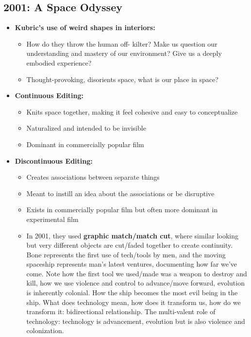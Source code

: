 \documentclass[11pt,fleqn]{book} %
\begin{document}
\subsection{2001: A Space Odyssey}
\begin{itemize}
    \item \textbf{Kubric's use of weird shapes in interiors:}
    \begin{itemize}
        \item How do they throw the human off-
kilter? Make us question our
understanding and mastery of our
environment? Give us a deeply
embodied experience?
        \item Thought-provoking, disorients space, what is our place in space?
    \end{itemize}
    \item \textbf{Continuous Editing:}
    \begin{itemize}
        \item Knits space together, making it feel cohesive and easy to conceptualize
        \item Naturalized and intended to be invisible
        \item Dominant in commercially popular film
    \end{itemize}
    \item \textbf{Discontinuous Editing:}
    \begin{itemize}
        \item Creates associations between separate things
        \item Meant to instill an idea about the associations or be disruptive
        \item Exists in commercially popular film but often more dominant in experimental film
        \item In 2001, they used \textbf{graphic match/match cut}, where similar looking but very different objects are cut/faded together to create continuity. Bone represents the first use of tech/tools by men, and the moving spaceship represents man's latest ventures, documenting how far we've come. Note how the first tool we used/made was a weapon to destroy and kill, how we use violence and control to advance/move forward, evolution is inherently colonial. How the ship becomes the most evil being in the ship. What does technology mean, how does it transform us, how do we transform it: bidirectional relationship. The multi-valent role of technology: technology is advancement, evolution but is also violence and colonization. 
    \end{itemize}

\end{itemize}
\end{document}

